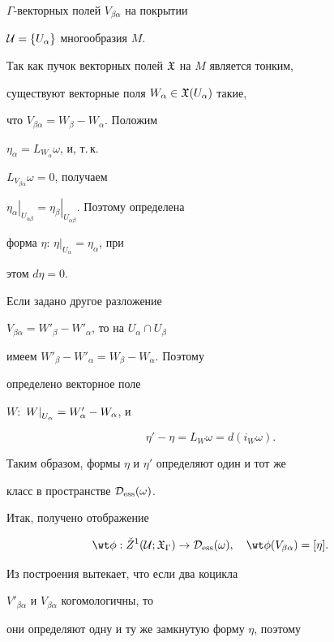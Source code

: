 $\Gamma$-векторных полей  $V_{\beta\alpha}$ на покрытии


${\cal U}=\{U_\alpha\}$ многообразия $M$.


Так как пучок векторных полей ${\frak X}$ на $M$ является тонким,


существуют векторные поля $W_\alpha \in {\frak X}(U_\alpha)$ такие,


что $V_{\beta\alpha} = W_\beta - W_\alpha$. Положим


$\eta_\alpha = L_{W_\alpha} \omega$, и, т.\,к.


$L_{V_{\beta\alpha}} \omega =0$, получаем


$\left.\eta_\alpha\right|_{U_{\alpha\beta}} =


\left.\eta_\beta\right|_{U_{\alpha\beta}}$. Поэтому определена


форма $\eta$: $\left.\eta\right|_{U_\alpha}=\eta_\alpha$, при


этом $d\eta = 0$.





Если задано другое разложение


$V_{\beta\alpha} = W'_\beta - W'_\alpha$, то на $U_\alpha \cap U_\beta$


имеем $W'_\beta - W'_\alpha = W_\beta - W_\alpha$. Поэтому


определено векторное поле


$W$: $\left. W \right|_{U_\alpha}=W'_\alpha-W_\alpha$, и


$$


\eta' - \eta = L_W\omega = d(i_W\omega).


$$


Таким образом, формы $\eta$ и $\eta'$ определяют один и тот же


класс в пространстве ${\cal D}_{\operatorname{ess}}(\omega)$.





Итак, получено отображение


$$


\wt\phi : \check Z^1(\cU; \gX_\Gamma) \to \cD_{\ess}(\omega),


\quad \wt\phi(V_{\beta\alpha}) = [\eta].


$$


Из построения вытекает, что если два коцикла


$V'_{\beta\alpha}$ и $V_{\beta\alpha}$ когомологичны, то


они определяют одну и ту же замкнутую форму $\eta$, поэтому


